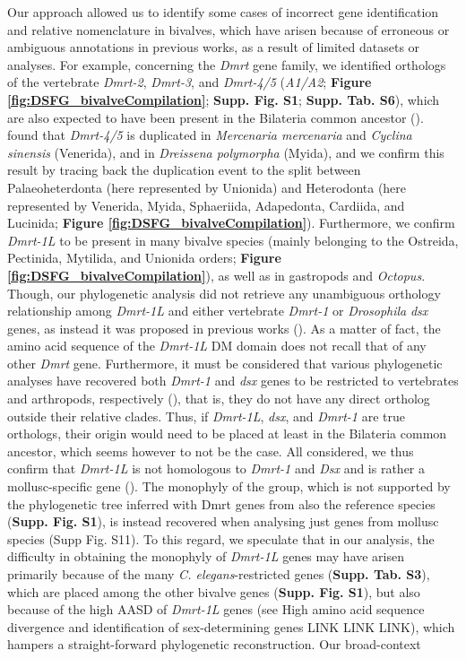 \documentclass[../main.tex]{subfiles}
\begin{document}
Our approach allowed us to identify some cases of incorrect gene identification and relative nomenclature in bivalves, which have arisen because of erroneous or ambiguous annotations in previous works, as a result of limited datasets or analyses. For example, concerning the \textit{Dmrt} gene family, we identified orthologs of the vertebrate \textit{Dmrt-2}, \textit{Dmrt-3}, and \textit{Dmrt-4/5} (\textit{A1/A2}; \textbf{Figure \ref{fig:DSFG_bivalveCompilation}}; \textbf{Supp. Fig. S1}; \textbf{Supp. Tab. S6}), which are also expected to have been present in the Bilateria common ancestor (\textbf{\cite{mawaribuchi2019independent}}). \textbf{\cite{wang2023genome}} found that \textit{Dmrt-4/5} is duplicated in \textit{Mercenaria mercenaria} and \textit{Cyclina sinensis} (Venerida), and in \textit{Dreissena polymorpha} (Myida), and we confirm this result by tracing back the duplication event to the split between Palaeoheterdonta (here represented by Unionida) and Heterodonta (here represented by Venerida, Myida, Sphaeriida, Adapedonta, Cardiida, and Lucinida; \textbf{Figure \ref{fig:DSFG_bivalveCompilation}}). Furthermore, we confirm \textit{Dmrt-1L} to be present in many bivalve species (mainly belonging to the Ostreida, Pectinida, Mytilida, and Unionida orders; \textbf{Figure \ref{fig:DSFG_bivalveCompilation}}), as well as in gastropods and \textit{Octopus}. Though, our phylogenetic analysis did not retrieve any unambiguous orthology relationship among \textit{Dmrt-1L} and either vertebrate \textit{Dmrt-1} or \textit{Drosophila} \textit{dsx} genes, as instead it was proposed in previous works (\textbf{\cite{li2018foxl2,evensen2022comparative}}). As a matter of fact, the amino acid sequence of the \textit{Dmrt-1L} DM domain does not recall that of any other \textit{Dmrt} gene. Furthermore, it must be considered that various phylogenetic analyses have recovered both \textit{Dmrt-1} and \textit{dsx} genes to be restricted to vertebrates and arthropods, respectively (\textbf{\cite{wexler2014pan,mawaribuchi2019independent,panara2019phylogenetic}}), that is, they do not have any direct ortholog outside their relative clades. Thus, if \textit{Dmrt-1L}, \textit{dsx}, and \textit{Dmrt-1} are true orthologs, their origin would need to be placed at least in the Bilateria common ancestor, which seems however to not be the case. All considered, we thus confirm that \textit{Dmrt-1L} is not homologous to \textit{Dmrt-1} and \textit{Dsx} and is rather a mollusc-specific gene (\textbf{\cite{evensen2022comparative}}). The monophyly of the group, which is not supported by the phylogenetic tree inferred with Dmrt genes from also the reference species (\textbf{Supp. Fig. S1}), is instead recovered when analysing just genes from mollusc species (Supp Fig. S11). To this regard, we speculate that in our analysis, the difficulty in obtaining the monophyly of \textit{Dmrt-1L} genes may have arisen primarily because of the many \textit{C. elegans}-restricted genes (\textbf{Supp. Tab. S3}), which are placed among the other bivalve genes (\textbf{Supp. Fig. S1}), but also because of the high AASD of \textit{Dmrt-1L} genes (see High amino acid sequence divergence and identification of sex-determining genes LINK LINK LINK), which hampers a straight-forward phylogenetic reconstruction. Our broad-context 
\end{document}
